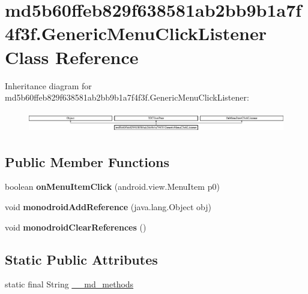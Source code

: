 \hypertarget{classmd5b60ffeb829f638581ab2bb9b1a7f4f3f_1_1GenericMenuClickListener}{}\section{md5b60ffeb829f638581ab2bb9b1a7f4f3f.\+Generic\+Menu\+Click\+Listener Class Reference}
\label{classmd5b60ffeb829f638581ab2bb9b1a7f4f3f_1_1GenericMenuClickListener}
Inheritance diagram for md5b60ffeb829f638581ab2bb9b1a7f4f3f.\+Generic\+Menu\+Click\+Listener\+:\begin{figure}[H]
\begin{center}
\leavevmode
\includegraphics[height=0.926385cm]{classmd5b60ffeb829f638581ab2bb9b1a7f4f3f_1_1GenericMenuClickListener}
\end{center}
\end{figure}
\subsection*{Public Member Functions}
\begin{DoxyCompactItemize}
\item 
\mbox{\label{classmd5b60ffeb829f638581ab2bb9b1a7f4f3f_1_1GenericMenuClickListener_a79412f7f13b9f7b52668e994eab1a66d}} 
boolean {\bfseries on\+Menu\+Item\+Click} (android.\+view.\+Menu\+Item p0)
\item 
\mbox{\label{classmd5b60ffeb829f638581ab2bb9b1a7f4f3f_1_1GenericMenuClickListener_a789da55ae23929b66b71f9e9357ff250}} 
void {\bfseries monodroid\+Add\+Reference} (java.\+lang.\+Object obj)
\item 
\mbox{\label{classmd5b60ffeb829f638581ab2bb9b1a7f4f3f_1_1GenericMenuClickListener_acd947cf5b70173321c638063cf1215d8}} 
void {\bfseries monodroid\+Clear\+References} ()
\end{DoxyCompactItemize}
\subsection*{Static Public Attributes}
\begin{DoxyCompactItemize}
\item 
static final String \hyperlink{classmd5b60ffeb829f638581ab2bb9b1a7f4f3f_1_1GenericMenuClickListener_a6c9c1226d60f05dc9be14f20174fdebb}{\+\_\+\+\_\+md\+\_\+methods}
\end{DoxyCompactItemize}
